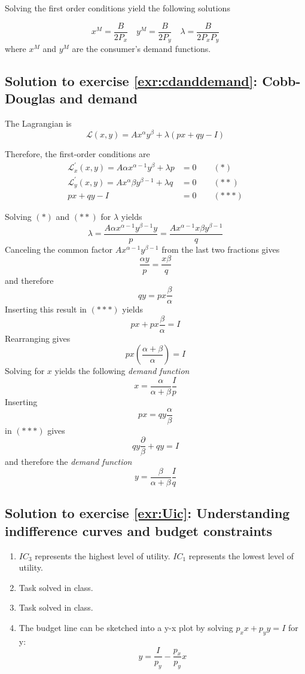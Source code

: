 \documentclass[
  12pt,
  oneside]{book}
\providecommand{\tightlist}{%
  \setlength{\itemsep}{0pt}\setlength{\parskip}{0pt}}
\theoremstyle{definition}
\theoremstyle{definition}
\theoremstyle{definition}
\theoremstyle{definition}
\theoremstyle{remark}
\begin{document}
Solving the first order conditions yield the following solutions

\[
  x^{M}=\frac{B}{2 P_{x}} \quad y^{M}=\frac{B}{2 P_{y}} \quad \lambda=\frac{B}{2 P_{x} P_{y}}
\]
where \(x^{M}\) and \(y^{M}\) are the consumer's demand functions.

\subsection*{Solution to exercise \ref{exr:cdanddemand}: Cobb-Douglas and demand}\label{sol:cdanddemand}

The Lagrangian is
\[
\mathcal{L}(x, y)=A x^{\alpha} y^{\beta}+\lambda(p x+q y-I)
\]

Therefore, the first-order conditions are
\[
    \begin{aligned}
        \mathcal{L}_{x}^{\prime}(x, y)=A \alpha x^{\alpha-1} y^{\beta}+\lambda p &=0 \qquad (*)\\
        \mathcal{L}_{y}^{\prime}(x, y)=A x^{\alpha} \beta y^{\beta-1}+\lambda q &=0  \qquad (**)\\
        p x+q y-I &=0  \qquad (***)
    \end{aligned}
\]

Solving \((*)\) and \((**)\) for \(\lambda\) yields
\[
\lambda=\frac{A \alpha x^{\alpha-1} y^{\beta-1} y}{p}=\frac{A x^{\alpha-1} x \beta y^{\beta-1}}{q}
\]
Canceling the common factor \(A x^{\alpha-1} y^{\beta-1}\) from the last two fractions gives
\[
    \frac{\alpha y}{p}=\frac{x \beta}{q}
\]
and therefore
\[
q y=p x \frac{\beta}{\alpha}
\]
Inserting this result in \((***)\) yields
\[
p x+p x \frac{\beta}{\alpha}=I
\]
Rearranging gives
\[
p x\left(\frac{\alpha+\beta}{\alpha}\right)=I
\]
Solving for \(x\) yields the following \textit{demand function}
\[
x=\frac{\alpha}{\alpha+\beta} \frac{I}{p}
\]
Inserting
\[
p x=q y \frac{\alpha}{\beta}
\]
in \((***)\) gives
\[
q y \frac{\partial}{\beta}+q y=I
\]
and therefore the \textit{demand function}
\[
y=\frac{\beta}{\alpha+\beta}  \frac{I}{q}
\]

\subsection*{Solution to exercise \ref{exr:Uic}: Understanding indifference curves and budget constraints}\label{sol:Uic}

\begin{enumerate}
\def\labelenumi{\alph{enumi})}
\tightlist
\item
  \(IC_3\) represents the highest level of utility. \(IC_1\) represents the lowest level of utility.\\
\item
  Task solved in class.
\item
  Task solved in class.
\item
  The budget line can be sketched into a y-x plot by solving \(p_xx+p_yy=I\) for y: \[y=\frac{I}{p_y}-\frac{p_x}{p_y}x\]
\end{enumerate}
\end{document}
